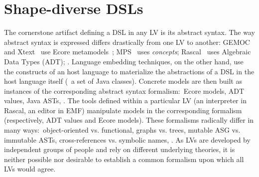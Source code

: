\section{Shape-diverse DSLs}
\label{sec:shapes}

The cornerstone artifact defining a DSL in any LV is its abstract syntax.
The way abstract syntax is expressed differs drastically from one LV to another: GEMOC~\cite{bousse2016execution} and Xtext~\cite{bettini2016implementing} use Ecore metamodels~\cite{steinberg2008emf}; MPS~\cite{voelter2014generic} uses \emph{concepts}; Rascal~\cite{klint2010easy} uses Algebraic Data Types (ADT); \etc.
Language embedding techniques, on the other hand, use the constructs of an host language to materialize the abstractions of a DSL in the host language itself (\eg~a set of Java classes).
Concrete models are then built as instances of the corresponding abstract syntax formalism:~Ecore models, ADT values, Java ASTs, \etc.
The tools defined within a particular LV (an interpreter in Rascal, an editor in EMF) manipulate models in the corresponding formalism (respectively, ADT values and Ecore models).
These formalisms radically differ in many ways:~object-oriented vs. functional, graphs vs. trees, mutable ASG vs. immutable ASTs, cross-references vs. symbolic names, \etc.
As LVs are developed by independent groups of people and rely on different underlying theories, it is neither possible nor desirable to establish a common formalism upon which all LVs would agree.

%
%

